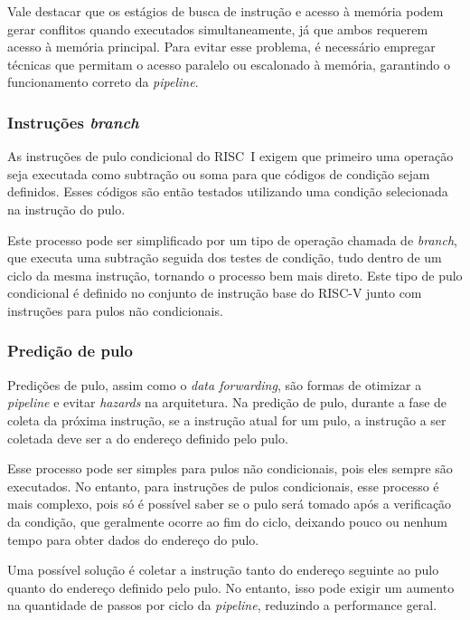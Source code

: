 \documentclass[
	12pt,				%
	openright,			%
	oneside,			%
	a4paper,			%
	english,			%
	french,				%
	spanish,			%
	brazil,				%
	]{abntex2}
\begin{document}
Vale destacar que os estágios de busca de instrução e acesso à memória podem gerar conflitos quando executados simultaneamente, já que ambos requerem acesso à memória principal. Para evitar esse problema, é necessário empregar técnicas que permitam o acesso paralelo ou escalonado à memória, garantindo o funcionamento correto da \textit{pipeline}.

\subsubsection{Instruções \textit{branch}}\label{recursos_branch}%

As instruções de pulo condicional do RISC~I exigem que primeiro uma operação seja executada como subtração ou soma para que códigos de condição sejam definidos. Esses códigos são então testados utilizando uma condição selecionada na instrução do pulo.

Este processo pode ser simplificado por um tipo de operação chamada de \textit{branch}, que executa uma subtração seguida dos testes de condição, tudo dentro de um ciclo da mesma instrução, tornando o processo bem mais direto. Este tipo de pulo condicional é definido no conjunto de instrução base do RISC-V junto com instruções para pulos não condicionais.

\subsubsection{Predição de pulo}\label{recursos_pred_pulo}%

Predições de pulo, assim como o \textit{data forwarding}, são formas de otimizar a \textit{pipeline} e evitar \textit{hazards} na arquitetura. Na predição de pulo, durante a fase de coleta da próxima instrução, se a instrução atual for um pulo, a instrução a ser coletada deve ser a do endereço definido pelo pulo.

Esse processo pode ser simples para pulos não condicionais, pois eles sempre são executados. No entanto, para instruções de pulos condicionais, esse processo é mais complexo, pois só é possível saber se o pulo será tomado após a verificação da condição, que geralmente ocorre ao fim do ciclo, deixando pouco ou nenhum tempo para obter dados do endereço do pulo.

Uma possível solução é coletar a instrução tanto do endereço seguinte ao pulo quanto do endereço definido pelo pulo. No entanto, isso pode exigir um aumento na quantidade de passos por ciclo da \textit{pipeline}, reduzindo a performance geral.
\end{document}
